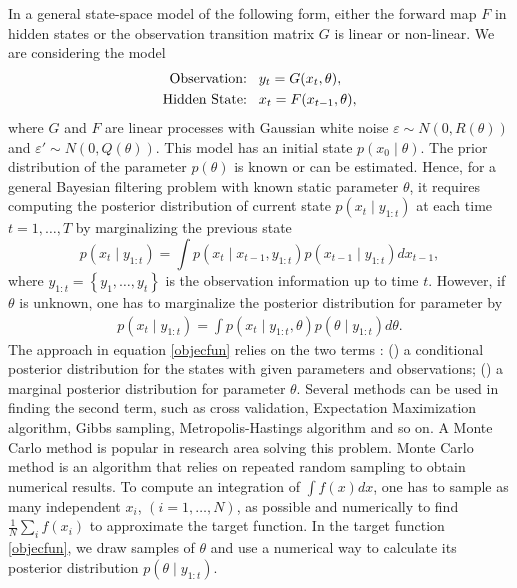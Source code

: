 In a general state-space model of the following form, either the forward map $F$ in hidden states or the observation transition matrix $G$ is linear or non-linear. We are considering the model 
\begin{align}\label{MCMCobserY}
\mbox{Observation:}\hspace*{0.3cm}   & y_t=G(x_t,\theta), \\
\mbox{Hidden State:}\hspace*{0.3cm} & x_t=F(x_{t-1},\theta),\label{MCMChiddX}
\end{align}
where $G$ and $F$ are linear processes with Gaussian white noise $\varepsilon\sim N\left( 0,R(\theta) \right)$ and $\varepsilon'\sim N\left( 0,Q(\theta) \right)$. This model has an initial state $p(x_0\mid \theta)$. The prior distribution of the parameter $p(\theta)$ is known or can be estimated. Hence, for a general Bayesian filtering problem with known static parameter $\theta$, it requires computing the posterior distribution of current state $p(x_t \mid y_{1:t})$ at each time $t=1,\dots, T$ by marginalizing the previous state
\begin{equation*}
p(x_t\mid y_{1:t}) = \int p(x_t\mid x_{t-1},y_{1:t})p(x_{t-1}\mid y_{1:t}) dx_{t-1}, 
\end{equation*}
where $y_{1:t} = \left\lbrace y_1,\dots,y_t\right\rbrace$ is the observation information up to time $t$. However, if $\theta$ is unknown, one has to marginalize the posterior distribution for parameter by 
\begin{align}\label{objecfun}
p(x_t \mid y_{1:t}) = \int p(x_t \mid y_{1:t},\theta)p(\theta\mid y_{1:t})d\theta.
\end{align}
The approach in equation \eqref{objecfun} relies on the two terms : () a conditional posterior distribution for the states with given parameters and observations; () a marginal posterior distribution for parameter $\theta$. Several methods can be used in finding the second term, such as cross validation, Expectation Maximization algorithm, Gibbs sampling, Metropolis-Hastings algorithm and so on. A Monte Carlo method is popular in research area solving this problem. Monte Carlo method is an algorithm that relies on repeated random sampling to obtain numerical results. To compute an integration of $\int f(x)dx$, one has to sample as many independent $x_i$, $(i = 1,\dots, N)$, as possible and numerically to find $\frac{1}{N}\sum_i f(x_i)$ to approximate the target function. In the target function \eqref{objecfun}, we draw samples of $\theta$ and use a numerical way to calculate its posterior distribution  $p(\theta\mid y_{1:t})$. 


